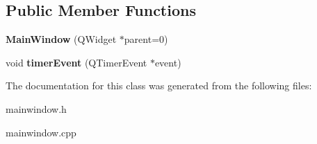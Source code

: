 \subsection*{Public Member Functions}
\begin{DoxyCompactItemize}
\item 
\mbox{\label{class_main_window_a8b244be8b7b7db1b08de2a2acb9409db}} 
{\bfseries Main\+Window} (Q\+Widget $\ast$parent=0)
\item 
\mbox{\label{class_main_window_aaa425b1554af3c1f58cc70b4815082ae}} 
void {\bfseries timer\+Event} (Q\+Timer\+Event $\ast$event)
\end{DoxyCompactItemize}


The documentation for this class was generated from the following files\+:\begin{DoxyCompactItemize}
\item 
mainwindow.\+h\item 
mainwindow.\+cpp\end{DoxyCompactItemize}
